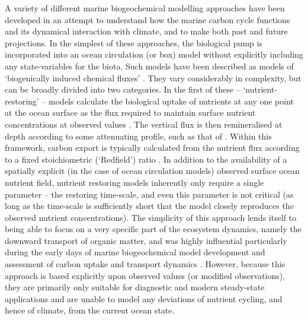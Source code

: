 \documentclass[gmd, manuscript]{copernicus}
\begin{document}
A variety of different marine biogeochemical modelling approaches have been developed in an attempt to understand how the marine carbon cycle functions and its dynamical interaction with climate, and to make both past and future projections. In the simplest of these approaches, the biological pump is incorporated into an ocean circulation (or box) model without explicitly including any state-variables for the biota. Such models have been described as models of `biogenically induced chemical fluxes' \citep[rather than explicitly of the biology - and ecology - itself;][]{Maier-Reimer:1993}. They vary considerably in complexity, but can be broadly divided into two categories. In the first of these -- `nutrient-restoring' -- models calculate the biological uptake of nutrients at any one point at the ocean surface as the flux required to maintain surface nutrient concentrations at observed values \cite[e.g.][]{Bacastow:1990,Najjar:1992}. The vertical flux is then remineralised at depth according to some attenuating profile, such as that of \citet{Martin:1987}. Within this framework, carbon export is typically calculated from the nutrient flux according to a fixed stoichiometric (`Redfield') ratio \citep{Redfield:1934}. In addition to the availability of a spatially explicit (in the case of ocean circulation models) observed surface ocean nutrient field, nutrient restoring models inherently only require a single parameter -- the restoring time-scale, and even this parameter is not critical (as long as the time-scale is sufficiently short that the model closely reproduces the observed nutrient concentrations). The simplicity of this approach lends itself to being able to focus on a very specific part of the ecosystem dynamics, namely the downward transport of organic matter, and was highly influential particularly during the early days of marine biogeochemical model development and assessment of carbon uptake and transport dynamics \citep[e.g.][]{Marchal:1998,Najjar:1992}. However, because this approach is based explicitly upon observed values (or modified observations), they are primarily only suitable for diagnostic and modern steady-state applications and are unable to model any deviations of nutrient cycling, and hence of climate, from the current ocean state. 
\end{document}
